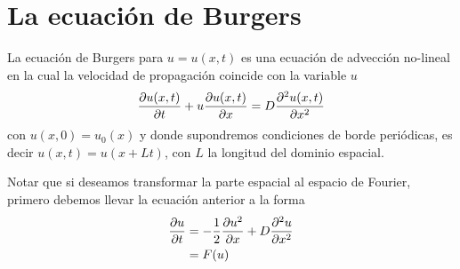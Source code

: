 \documentclass[letterpaper, onecolumn, 11pt]{report}
\begin{document}
\sffamily
%

\section*{La ecuación de Burgers}
La ecuación de Burgers para $u=u(x,t)$ es una ecuación de advección no-lineal en la cual la velocidad de propagación coincide con la variable $u$
\begin{equation}
	\pdv{u(x,t)}{t} + u\pdv{u(x,t)}{x} = D\pdv[2]{u(x,t)}{x}
\end{equation}
con $u(x,0)=u_0(x)$ y donde supondremos condiciones de borde periódicas, es decir $u(x,t)=u(x+Lt)$, con $L$ la longitud del dominio espacial.

Notar que si deseamos transformar la parte espacial al espacio de Fourier, primero debemos llevar la ecuación anterior a la forma
\begin{align}
	\pdv{u}{t} &= -\frac{1}2\pdv{u^2}{x} + D \pdv[2]{u}{x}\\
						 &=F(u)
\end{align}
\end{document}
